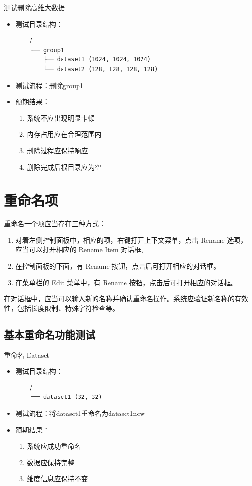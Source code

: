\documentclass[a4paper,12pt]{report}	%
\begin{document}
测试删除高维大数据
\begin{itemize}
    \item 测试目录结构：
    \begin{verbatim}
    /
    └── group1
        ├── dataset1 (1024, 1024, 1024)
        └── dataset2 (128, 128, 128, 128)
    \end{verbatim}
    \item 测试流程：删除group1
    \item 预期结果：
    \begin{enumerate}
        \item 系统不应出现明显卡顿
        \item 内存占用应在合理范围内
        \item 删除过程应保持响应
        \item 删除完成后根目录应为空
    \end{enumerate}
\end{itemize}

\section{重命名项}

重命名一个项应当存在三种方式：
\begin{enumerate}
    \item 对着左侧控制面板中，相应的项，右键打开上下文菜单，点击 Rename 选项，应当可以打开相应的 Rename Item 对话框。
    \item 在控制面板的下面，有 Rename 按钮，点击后可打开相应的对话框。
    \item 在菜单栏的 Edit 菜单中，有 Rename 按钮，点击后可打开相应的对话框。
\end{enumerate}

在对话框中，应当可以输入新的名称并确认重命名操作。系统应验证新名称的有效性，包括长度限制、特殊字符检查等。

\subsection{基本重命名功能测试}
重命名 Dataset
\begin{itemize}
    \item 测试目录结构：
    \begin{verbatim}
    /
    └── dataset1 (32, 32)
    \end{verbatim}
    \item 测试流程：将dataset1重命名为dataset1\textunderscore new
    \item 预期结果：
    \begin{enumerate}
        \item 系统应成功重命名
        \item 数据应保持完整
        \item 维度信息应保持不变
    \end{enumerate}
\end{itemize}
\end{document}
